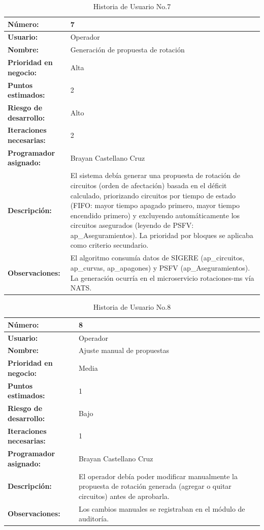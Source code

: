 \begin{table}[H]
\centering
\caption{Historia de Usuario No.7}
\label{tab:hu_07}
\footnotesize
\begin{tabular}{|p{3cm}|p{9cm}|}
\hline
\textbf{Número:} & 7 \\
\hline
\textbf{Usuario:} & Operador \\
\hline
\textbf{Nombre:} & Generación de propuesta de rotación \\
\hline
\textbf{Prioridad en negocio:} & Alta \\
\hline
\textbf{Puntos estimados:} & 2 \\
\hline
\textbf{Riesgo de desarrollo:} & Alto \\
\hline
\textbf{Iteraciones necesarias:} & 2 \\
\hline
\textbf{Programador asignado:} & Brayan Castellano Cruz \\
\hline
\textbf{Descripción:} & El sistema debía generar una propuesta de rotación de circuitos (orden de afectación) basada en el déficit calculado, priorizando circuitos por tiempo de estado (FIFO: mayor tiempo apagado primero, mayor tiempo encendido primero) y excluyendo automáticamente los circuitos asegurados (leyendo de PSFV: ap\_Aseguramientos). La prioridad por bloques se aplicaba como criterio secundario. \\
\hline
\textbf{Observaciones:} & El algoritmo consumía datos de SIGERE (ap\_circuitos, ap\_curvas, ap\_apagones) y PSFV (ap\_Aseguramientos). La generación ocurría en el microservicio rotaciones-ms vía NATS. \\
\hline
\end{tabular}
\end{table}

\begin{table}[H]
\centering
\caption{Historia de Usuario No.8}
\label{tab:hu_08}
\footnotesize
\begin{tabular}{|p{3cm}|p{9cm}|}
\hline
\textbf{Número:} & 8 \\
\hline
\textbf{Usuario:} & Operador \\
\hline
\textbf{Nombre:} & Ajuste manual de propuestas \\
\hline
\textbf{Prioridad en negocio:} & Media \\
\hline
\textbf{Puntos estimados:} & 1 \\
\hline
\textbf{Riesgo de desarrollo:} & Bajo \\
\hline
\textbf{Iteraciones necesarias:} & 1 \\
\hline
\textbf{Programador asignado:} & Brayan Castellano Cruz \\
\hline
\textbf{Descripción:} & El operador debía poder modificar manualmente la propuesta de rotación generada (agregar o quitar circuitos) antes de aprobarla. \\
\hline
\textbf{Observaciones:} & Los cambios manuales se registraban en el módulo de auditoría. \\
\hline
\end{tabular}
\end{table}

